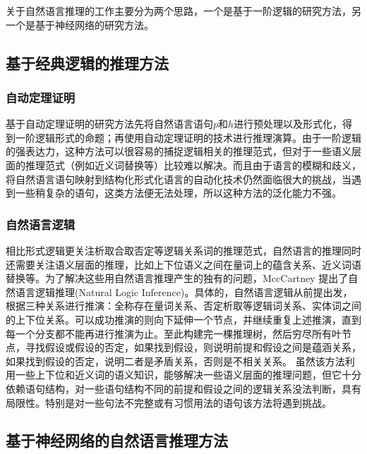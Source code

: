 \documentclass[UTF8,11pt,a4paper,nofonts]{ctexart}
\begin{document}
关于自然语言推理的工作主要分为两个思路，一个是基于一阶逻辑的研究方法，另一个是基于神经网络的研究方法。

\subsection{基于经典逻辑的推理方法}

\subsubsection{自动定理证明}

基于自动定理证明的研究方法\cite{Bos2005RecognisingTE, Abzianidze2017APL}先将自然语言语句$p$和$h$进行预处理以及形式化，得到一阶逻辑形式的命题；再使用自动定理证明\cite{Chang1973SymbolicLA}的技术进行推理演算。由于一阶逻辑的强表达力，这种方法可以很容易的捕捉逻辑相关的推理范式，但对于一些语义层面的推理范式（例如近义词替换等）比较难以解决。而且由于语言的模糊和歧义，将自然语言语句映射到结构化形式化语言的自动化技术仍然面临很大的挑战，当遇到一些稍复杂的语句，这类方法便无法处理，所以这种方法的泛化能力不强。

\subsubsection{自然语言逻辑}


相比形式逻辑更关注析取合取否定等逻辑关系词的推理范式，自然语言的推理同时还需要关注语义层面的推理，比如上下位语义之间在量词上的蕴含关系、近义词语替换等。为了解决这些用自然语言推理产生的独有的问题，MccCartney 提出了自然语言逻辑推理(Natural Logic Inference)\cite{MacCartney2007NaturalLF, Angeli2014NaturalLINL}。具体的，自然语言逻辑从前提出发，根据三种关系进行推演：全称存在量词关系、否定析取等逻辑词关系、实体词之间的上下位关系。可以成功推演的则向下延伸一个节点，并继续重复上述推演，直到每一个分支都不能再进行推演为止。至此构建完一棵推理树，然后穷尽所有叶节点，寻找假设或假设的否定，如果找到假设，则说明前提和假设之间是蕴涵关系，如果找到假设的否定，说明二者是矛盾关系，否则是不相关关系。
虽然该方法利用一些上下位和近义词的语义知识，能够解决一些语义层面的推理问题，但它十分依赖语句结构，对一些语句结构不同的前提和假设之间的逻辑关系没法判断，具有局限性。特别是对一些句法不完整或有习惯用法的语句该方法将遇到挑战。




\subsection{基于神经网络的自然语言推理方法}
\end{document}

